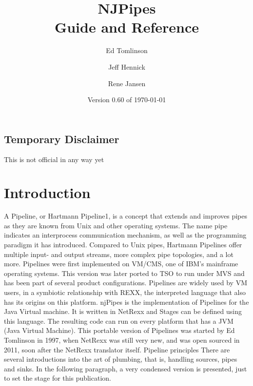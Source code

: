 
        
\setcounter{tocdepth}{1} 
\title{NJPipes\protect\\ Guide and Reference}
\author{Ed Tomlinson \and Jeff Hennick \and Rene Jansen}
\date{Version 0.60 of \today}
\maketitle
{}
\pagestyle{plain}
\frontmatter
{}
\pagestyle{plain}
\section*{Temporary Disclaimer}
This is not official in any way yet
\newpage
\tableofcontents
\newpage
{}
\frontmatter
\large


\mainmatter
\chapter{Introduction}
A Pipeline, or Hartmann Pipeline1, is a concept that extends and improves pipes as they are known from Unix and other operating systems. The name pipe indicates an interprocess communication mechanism, as well as the programming paradigm it has introduced. Compared to Unix pipes, Hartmann Pipelines offer multiple input- and output streams, more complex pipe topologies, and a lot more.
Pipelines were first implemented on VM/CMS, one of IBM's mainframe operating systems. This version was later ported to TSO to run under MVS and has been part of several product configurations. Pipelines are widely used by VM users, in a symbiotic relationship with REXX, the interpreted language that also has its origins on this platform.
njPipes is the implementation of Pipelines for the Java Virtual machine. It is written in NetRexx and Stages can be defined using this language. The resulting code can run on every platform that has a JVM (Java Virtual Machine). This portable version of Pipelines was started by Ed Tomlinson in 1997, when NetRexx was still very new, and was open sourced in 2011, soon after the NetRexx translator itself.
Pipeline principles
There are several introductions into the art of plumbing, that is, handling sources, pipes and sinks. In the following paragraph, a very condensed version is presented, just to set the stage for this publication.

